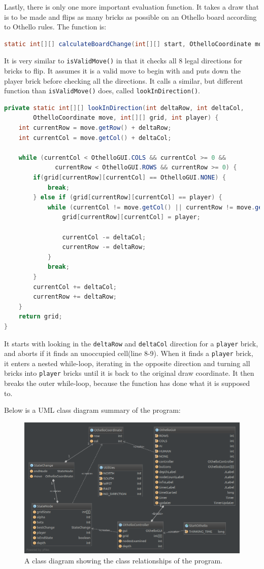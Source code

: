 \documentclass{article}
\begin{document}
Lastly, there is only one more important evaluation function. It takes a draw that is to be made and flips
as many bricks as possible on an Othello board according to Othello rules. The function is:

\begin{lstlisting}[language=Java]
static int[][] calculateBoardChange(int[][] start, OthelloCoordinate move, int player)
\end{lstlisting}

It is very similar to \verb|isValidMove()| in that it checks all 8 legal directions for bricks to flip.
It assumes it is a valid move to begin with and puts down the player brick before checking all the directions.
It calls a similar, but different function than \verb|isValidMove()| does, called \verb|lookInDirection()|.
\newpage

\begin{lstlisting}[language=Java]
private static int[][] lookInDirection(int deltaRow, int deltaCol,
        OthelloCoordinate move, int[][] grid, int player) {
    int currentRow = move.getRow() + deltaRow;
    int currentCol = move.getCol() + deltaCol;

    while (currentCol < OthelloGUI.COLS && currentCol >= 0 &&
              currentRow < OthelloGUI.ROWS && currentRow >= 0) {
        if(grid[currentRow][currentCol] == OthelloGUI.NONE) {
            break;
        } else if (grid[currentRow][currentCol] == player) {
            while (currentCol != move.getCol() || currentRow != move.getRow()) {
                grid[currentRow][currentCol] = player;

                currentCol -= deltaCol;
                currentRow -= deltaRow;
            }
            break;
        }
        currentCol += deltaCol;
        currentRow += deltaRow;
    }
    return grid;
}
\end{lstlisting}

It starts with looking in the \verb|deltaRow| and \verb|deltaCol| direction for a \verb|player| brick,
and aborts if it finds an unoccupied cell(line 8-9). When it finds a \verb|player| brick, it enters
a nested while-loop, iterating in the opposite direction and turning all bricks into \verb|player| bricks until
it is back to the original draw coordinate. It then breaks the outer while-loop, because the function has done
what it is supposed to.

Below is a UML class diagram summary of the program:

\begin{figure}[h]
\includegraphics[width=\textwidth]{diagram.png}
\centering
\caption{A class diagram showing the class relationships of the program.}
\end{figure}



\end{document}
